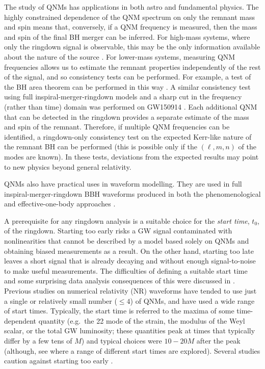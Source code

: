 The study of QNMs has applications in both astro and fundamental physics. 
The highly constrained dependence of the QNM spectrum on only the remnant mass and spin means that, conversely, if a QNM frequency is measured, then the mass and spin of the final BH merger can be inferred. 
For high-mass systems, where only the ringdown signal is observable, this may be the only information available about the nature of the source \cite{bcw, 2020PhRvD.101h4053B}. 
For lower-mass systems, measuring QNM frequencies allows us to estimate the remnant properties independently of the rest of the signal, and so consistency tests can be performed. 
For example, a test of the BH area theorem can be performed in this way \cite{2018PhRvD..97l4069C, 2020arXiv201204486I}. 
A similar consistency test using full inspiral-merger-ringdown models and a sharp cut in the frequency (rather than time) domain was performed on GW150914 \cite{tgr}. 
Each additional QNM that can be detected in the ringdown provides a separate estimate of the mass and spin of the remnant. 
Therefore, if multiple QNM frequencies can be identified, a ringdown-only consistency test on the expected Kerr-like nature of the remnant BH can be performed \cite{2004CQGra..21..787D, 2019PhRvD..99l3029C} (this is possible only if the $(\ell, m, n)$ of the modes are known). 
In these tests, deviations from the expected results may point to new physics beyond general relativity. 

QNMs also have practical uses in waveform modelling.
They are used in full inspiral-merger-ringdown BBH waveforms produced in both the phenomenological \cite{2020arXiv200406503P, 2020PhRvD.102f4002G, 2020PhRvD.102f4001P} and effective-one-body approaches \cite{2007PhRvD..75l4018B, 2007PhRvD..76j4049B, 2011PhRvD..84l4052P}.

A prerequisite for any ringdown analysis is a suitable choice for the \emph{start time}, $t_0$, of the ringdown. 
Starting too early risks a GW signal contaminated with nonlinearities that cannot be described by a model based solely on QNMs and obtaining biased measurements as a result. 
On the other hand, starting too late leaves a short signal that is already decaying and without enough signal-to-noise to make useful measurements. 
The difficulties of defining a suitable start time and some surprising data analysis consequences of this were discussed in \cite{2017arXiv170605152T}. 
Previous studies on numerical relativity (NR) waveforms have tended to use just a single \cite{1998PhRvD..57.4535F} or relatively small number ($\leq 4$) \cite{2012PhRvD..85b4018K, 2014PhRvD..90l4032L, 2018PhRvD..98j4020C, 2018PhRvD..97j4065B} of QNMs, and have used a wide range of start times. 
Typically, the start time is referred to the maxima of some time-dependent quantity (e.g.\ the 22 mode of the strain, the modulus of the Weyl scalar, or the total GW luminosity; these quantities peak at times that typically differ by a few tens of $M$) and typical choices were ${10-20M}$ after the peak (although, see \cite{2007PhRvD..76f4034B} where a range of different start times are explored). 
Several studies caution against starting too early \cite{2020PhRvD.102d4053J, 2020PhRvD.101d4033B}.

